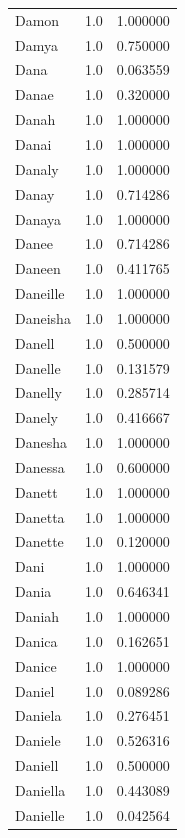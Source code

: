 \documentclass[
  letterpaper,
  DIV=11,
  numbers=noendperiod]{scrreprt}
\begin{document}
\begin{tabular}{lrr}
Damon           &   1.0 &   1.000000 \\
Damya           &   1.0 &   0.750000 \\
Dana            &   1.0 &   0.063559 \\
Danae           &   1.0 &   0.320000 \\
Danah           &   1.0 &   1.000000 \\
Danai           &   1.0 &   1.000000 \\
Danaly          &   1.0 &   1.000000 \\
Danay           &   1.0 &   0.714286 \\
Danaya          &   1.0 &   1.000000 \\
Danee           &   1.0 &   0.714286 \\
Daneen          &   1.0 &   0.411765 \\
Daneille        &   1.0 &   1.000000 \\
Daneisha        &   1.0 &   1.000000 \\
Danell          &   1.0 &   0.500000 \\
Danelle         &   1.0 &   0.131579 \\
Danelly         &   1.0 &   0.285714 \\
Danely          &   1.0 &   0.416667 \\
Danesha         &   1.0 &   1.000000 \\
Danessa         &   1.0 &   0.600000 \\
Danett          &   1.0 &   1.000000 \\
Danetta         &   1.0 &   1.000000 \\
Danette         &   1.0 &   0.120000 \\
Dani            &   1.0 &   1.000000 \\
Dania           &   1.0 &   0.646341 \\
Daniah          &   1.0 &   1.000000 \\
Danica          &   1.0 &   0.162651 \\
Danice          &   1.0 &   1.000000 \\
Daniel          &   1.0 &   0.089286 \\
Daniela         &   1.0 &   0.276451 \\
Daniele         &   1.0 &   0.526316 \\
Daniell         &   1.0 &   0.500000 \\
Daniella        &   1.0 &   0.443089 \\
Danielle        &   1.0 &   0.042564 \\

\end{tabular}
\end{document}
